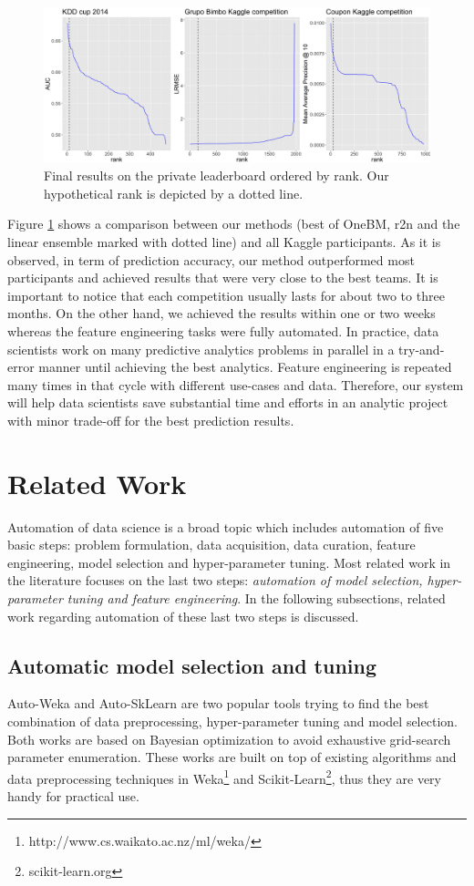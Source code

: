  \begin{figure}[tb]
    \centering
    \includegraphics[width=1.0\textwidth]{./rank.png}
    \caption{Final results on the private leaderboard ordered by rank. Our hypothetical rank is depicted by a dotted line.}
    \label{fig:rank}
\end{figure} 

Figure \ref{fig:rank} shows a comparison between our methods (best of OneBM, r2n and the linear ensemble marked with dotted line) and all Kaggle participants. As it is observed, in term of prediction accuracy, our method outperformed most participants and achieved results that were very close to the best teams. It is important to notice that each competition usually lasts for about two to three months. On the other hand, we achieved the results within one or two weeks whereas the feature engineering tasks were fully automated. In practice, data scientists work on many predictive analytics problems in parallel in a try-and-error manner until achieving the best analytics. Feature engineering is repeated many times in that cycle with different use-cases and data. Therefore,  our system will help data scientists save substantial time and efforts in an analytic project with minor trade-off for the best prediction results.   
\section{Related Work}
Automation of data science is a broad topic which includes automation of five basic steps: problem formulation, data acquisition, data curation, feature engineering, model selection and hyper-parameter tuning. Most related work in the literature focuses on the last two steps: \textit{automation of model selection, hyper-parameter tuning and feature engineering}. In the following subsections, related work regarding automation of these last two steps is discussed.
\subsection{Automatic model selection and tuning}
Auto-Weka \cite{kotthoff2016auto,ThoHutHooLey13-AutoWEKA} and Auto-SkLearn \cite{feurer2015efficient} are two popular tools trying to find the best combination of data preprocessing, hyper-parameter tuning and model selection. Both works are based on  Bayesian optimization \cite{brochu2010tutorial} to avoid exhaustive grid-search parameter enumeration. These works are built on top of existing algorithms and data preprocessing techniques in Weka\footnote{http://www.cs.waikato.ac.nz/ml/weka/} and Scikit-Learn\footnote{scikit-learn.org}, thus they are very handy for practical use.


